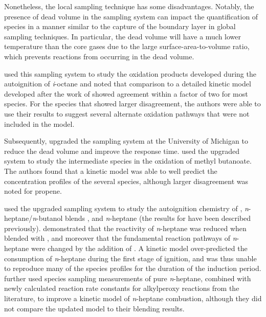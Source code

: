 \documentclass[../main.tex]{subfiles}
\begin{document}
Nonetheless, the local sampling technique has some disadvantages.
Notably, the presence of dead volume in the sampling system can impact
the quantification of species in a manner similar to the capture of the
boundary layer in global sampling techniques. In particular, the dead
volume will have a much lower temperature than the core gases due to the
large surface-area-to-volume ratio, which prevents reactions from
occurring in the dead volume.

\textcite{He2007} used this sampling system to study the oxidation
products developed during the autoignition of \textit{i}-octane and noted
that comparison to a detailed kinetic model developed after the work of
\textcite{Minetti1996} showed agreement within a factor of two for most
species. For the species that showed larger disagreement, the authors
were able to use their results to suggest several alternate oxidation
pathways that were not included in the model.

Subsequently, \textcite{Walton2008} upgraded the sampling system at the
University of Michigan to reduce the dead volume and improve the
response time. \textcite{Walton2011} used the upgraded system to study
the intermediate species in the oxidation of methyl butanoate. The
authors found that a kinetic model was able to well predict the concentration
profiles of the several species, although larger disagreement was noted
for propene.

\textcite{Karwat2011a, Karwat2012, Karwat2013} used the upgraded
sampling system to study the autoignition chemistry of \nBuOH{}
\cite{Karwat2011a}, \textit{n}-heptane/\textit{n}-butanol blends
\cite{Karwat2012}, and \textit{n}-heptane \cite{Karwat2013} (the results
for \nBuOH{} have been described previously). \textcite{Karwat2012}
demonstrated that the reactivity of \textit{n}-heptane was reduced when
blended with \nBuOH{}, and moreover that the fundamental reaction
pathways of \textit{n}-heptane were changed by the addition of \nBuOH{}.
A kinetic model over-predicted the consumption of \textit{n}-heptane
during the first stage of ignition, and was thus unable to reproduce many
of the species profiles for the duration of the induction period.
\textcite{Karwat2013} further used species sampling measurements of pure
\textit{n}-heptane, combined with newly calculated reaction rate constants
for alkylperoxy reactions from the literature, to improve a kinetic
model of \textit{n}-heptane combustion, although they did not compare the
updated model to their blending results.
\end{document}
